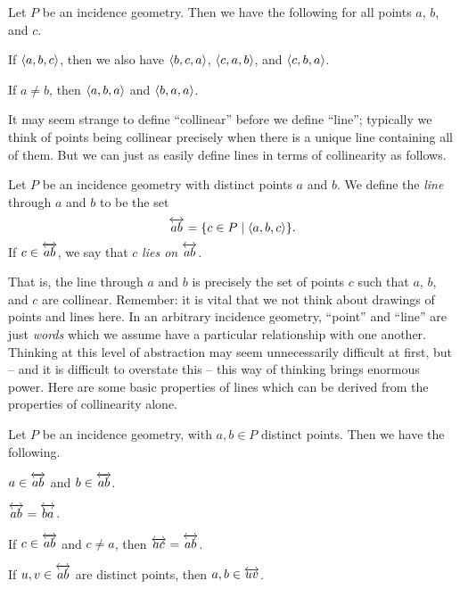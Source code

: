 \begin{prop}
Let $P$ be an incidence geometry. Then we have the following for all points $a$, $b$, and $c$.
\begin{proplist}
\item If $\langle a, b, c \rangle$, then we also have $\langle b, c, a \rangle$, $\langle c, a, b \rangle$, and $\langle c, b, a \rangle$.

\item If $a \neq b$, then $\langle a, b, a \rangle$ and $\langle b, a, a \rangle$.
\end{proplist}
\end{prop}

It may seem strange to define ``collinear'' before we define ``line''; typically we think of points being collinear precisely when there is a unique line containing all of them. But we can just as easily define lines in terms of collinearity as follows.

\begin{dfn}[Line]
Let $P$ be an incidence geometry with distinct points $a$ and $b$. We define the \emph{line} through $a$ and $b$ to be the set \[ \overleftrightarrow{ab} = \{ c \in P \mid \langle a, b, c \rangle \}. \] If $c \in \overleftrightarrow{ab}$, we say that $c$ \emph{lies on} $\overleftrightarrow{ab}$.
\end{dfn}

That is, the line through $a$ and $b$ is precisely the set of points $c$ such that $a$, $b$, and $c$ are collinear. Remember: it is vital that we not think about drawings of points and lines here. In an arbitrary incidence geometry, ``point'' and ``line'' are just \emph{words} which we assume have a particular relationship with one another. Thinking at this level of abstraction may seem unnecessarily difficult at first, but -- and it is difficult to overstate this -- this way of thinking brings enormous power. Here are some basic properties of lines which can be derived from the properties of collinearity alone.

\begin{prop}
Let $P$ be an incidence geometry, with $a,b \in P$ distinct points. Then we have the following.
\begin{proplist}
\item $a \in \overleftrightarrow{ab}$ and $b \in \overleftrightarrow{ab}$.
\item $\overleftrightarrow{ab} = \overleftrightarrow{ba}$.
\item If $c \in \overleftrightarrow{ab}$ and $c \neq a$, then $\overleftrightarrow{ac} = \overleftrightarrow{ab}$.
\item If $u,v \in \overleftrightarrow{ab}$ are distinct points, then $a,b \in \overleftrightarrow{uv}$.
\end{proplist}
\end{prop}

